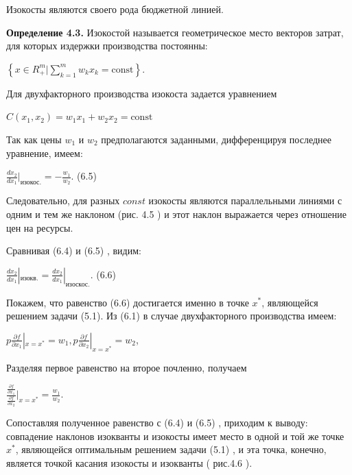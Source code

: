 \documentclass[12pt, 4paper]{book}
\begin{document}
{Изокосты являются своего рода бюджетной линией. 
\par

\textbf{Определение 4.3.} Изокостой называется геометрическое место векторов затрат, для которых издержки производства постоянны: 
\begin{center}
$\left\{ x\in R_{+}^{m}|\sum\limits_{k=1}^{m}w_k x_k = \text{const}\right\}$.
\end{center}
\par

Для двухфакторного производства изокоста задается уравнением 
\begin{center}
$C(x_1,x_2)=w_1x_1 + w_2 x_2 = \text{const}$
\end{center}
\par

Так как цены $w_1$ и $w_2$ предполагаются заданными, дифференцируя последнее уравнение, имеем: 
\begin{center}
$\frac{dx_2}{d x_1}|_{\text{изокос.}}=-\frac{w_1}{w_2}.$ (6.5)
\end{center}
\par

Следовательно, для разных $const$ изокосты являются параллельными линиями с одним и тем же наклоном  (рис. 4.5 ) и этот наклон выражается через отношение цен на ресурсы. 
\par

Сравнивая (6.4) и (6.5) , видим: 
\begin{center}
$\frac{d x_2}{d x_1}|_{\text{изокв.}}=\frac{d x_2}{d x_1}|_{\text{изоскос.}}$. (6.6)
\end{center}
Покажем, что равенство (6.6) достигается именно в точке $x^{*}$, являющейся решением задачи (5.1). Из (6.1) в случае двухфакторного производства имеем: 
\begin{center}
$p\frac{\partial f}{\partial x_1}|_{x=x^{*}} = w_1, p\frac{\partial f}{\partial x_2}|_{x=x^{*}}=w_2$,
\end{center}
\par

Разделяя первое равенство на второе почленно, получаем 
\begin{center}
$\frac{\frac{\partial f}{\partial x_1}}{\frac{\partial f}{\partial x_2}}|_{x=x^{*}}=\frac{w_1}{w_2}$.
\end{center}
Сопоставляя полученное равенство с (6.4) и (6.5) , приходим к выводу: совпадение наклонов изокванты и изокосты имеет место в одной и той же точке $x^{*}$, являющейся оптимальным решением задачи (5.1) , и эта точка, конечно, является точкой касания изокосты и изокванты ( рис.4.6 ). 
\par

}
\end{document}
